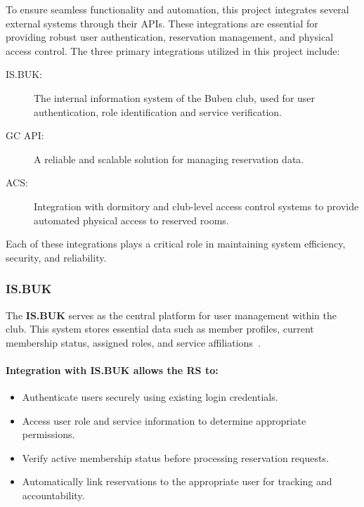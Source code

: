 To ensure seamless functionality and automation, this project integrates several external systems through their APIs. These integrations are essential for providing robust user authentication, reservation management, and physical access control. The three primary integrations utilized in this project include:

\begin{description}
  \item[IS.BUK:] The internal information system of the Buben club, used for user authentication, role identification and service verification.
  \item[GC API:] A reliable and scalable solution for managing reservation data.
  \item[ACS:] Integration with dormitory and club-level access control systems to provide automated physical access to reserved rooms.
\end{description}

Each of these integrations plays a critical role in maintaining system efficiency, security, and reliability. 

\subsubsection{IS.BUK}

The \textbf{IS.BUK} serves as the central platform for user management within the club. This system stores essential data such as member profiles, current membership status, assigned roles, and service affiliations~\cite{ISBUK}.

\paragraph{Integration with IS.BUK allows the RS to:}

\begin{itemize}
  \item Authenticate users securely using existing login credentials.
  \item Access user role and service information to determine appropriate permissions.
  \item Verify active membership status before processing reservation requests.
  \item Automatically link reservations to the appropriate user for tracking and accountability.
\end{itemize}

